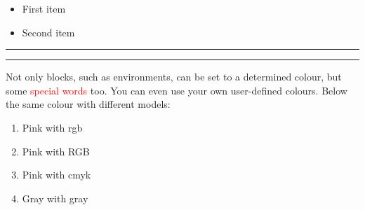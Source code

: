 \documentclass{article}
\begin{document}

 

\begin{itemize}

\item \textcolor{Mycolor1}{First item}

\item \textcolor{Mycolor2}{Second item}

\end{itemize}

 


{\color{LightRubineRed} \rule{\linewidth}{1mm} }

 


{\color{RubineRed} \rule{\linewidth}{1mm} }

 

 

Not only blocks, such as environments, can be set to a determined colour, but some \textcolor{red}{special words} too. You can even use your own user-defined colours. Below the same colour with different models:

 

\begin{enumerate}

\item \textcolor{mypink1}{Pink with rgb}

\item \textcolor{mypink2}{Pink with RGB}

\item \textcolor{mypink3}{Pink with cmyk}

\item \textcolor{mygray}{Gray with gray}

\end{enumerate}

 


 


 

\end{document}
